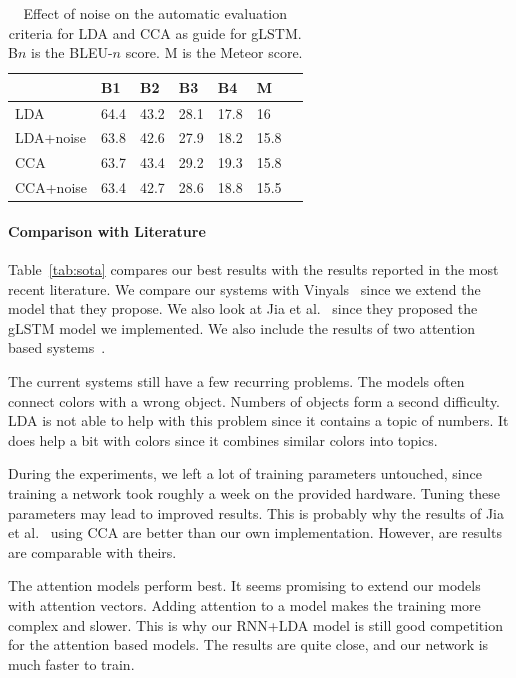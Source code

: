 \documentclass[twoside,twocolumn]{article}
\begin{document}
	\begin{table}
		\centering
		\begin{tabular}{lllllll}
			~                  & B1 & B2 & B3 & B4 & M \\ \hline
			LDA   & 64.4   & 43.2   & 28.1   & 17.8 & 16 \\
			LDA+noise   & 63.8   & 42.6   & 27.9   & 18.2 & 15.8\\ \hline
			CCA   & 63.7   & 43.4   & 29.2   & 19.3 & 15.8 \\
			CCA+noise   & 63.4  & 42.7   & 28.6   & 18.8 & 15.5 \\ \hline			
		\end{tabular}
		\caption{Effect of noise on the automatic evaluation criteria for LDA and CCA as guide for gLSTM. B$n$ is the BLEU-$n$ score. M is the Meteor score.}
		\label{table:noisy}
	\end{table}
	
	
	
	\paragraph{Comparison with Literature}
	Table~\ref{tab:sota} compares our best results with the results reported in the most recent literature. We compare our systems with Vinyals~\cite{Google} since we extend the model that they propose. We also look at Jia et al.~\cite{Fernando2015} since they proposed the gLSTM model we implemented. We also include the results of two attention based systems~\cite{Jin2015, Xu2015}. 
	
	The current systems still have a few recurring problems. The models often connect colors with a wrong object. Numbers of objects form a second difficulty. LDA is not able to help with this problem since it contains a topic of numbers. It does help a bit with colors since it combines similar colors into topics.
	
	During the experiments, we left a lot of training parameters untouched, since training a network took roughly a week on the provided hardware. Tuning these parameters may lead to improved results. This is probably why the results of Jia et al.~\cite{Fernando2015} using CCA are better than our own implementation. However, are results are comparable with theirs. 
	
	The attention models perform best. It seems promising to extend our models with attention vectors. Adding attention to a model makes the training more complex and slower. This is why our RNN+LDA model is still good competition for the attention based models. The results are quite close, and our network is much faster to train. 
	
\end{document}
